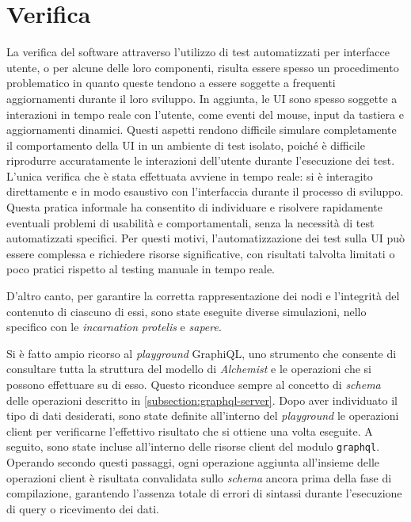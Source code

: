 \section{Verifica}
La verifica del software attraverso l'utilizzo di test automatizzati per interfacce utente, o per alcune delle loro componenti, risulta essere spesso un procedimento problematico in quanto queste tendono a essere soggette a frequenti aggiornamenti durante il loro sviluppo. In aggiunta, le \ac{UI} sono spesso soggette  a interazioni in tempo reale con l'utente, come eventi del mouse, input da tastiera e aggiornamenti dinamici. Questi aspetti rendono difficile simulare completamente il comportamento della \ac{UI} in un ambiente di test isolato, poiché è difficile riprodurre accuratamente le interazioni dell'utente durante l'esecuzione dei test. L'unica verifica che è stata effettuata avviene in tempo reale: si è interagito direttamente e in modo esaustivo con l'interfaccia durante il processo di sviluppo. Questa pratica informale ha consentito di individuare e risolvere rapidamente eventuali problemi di usabilità e comportamentali, senza la necessità di test automatizzati specifici. 
Per questi motivi, l'automatizzazione dei test sulla UI può essere complessa e richiedere risorse significative, con risultati talvolta limitati o poco pratici rispetto al testing manuale in tempo reale.

D'altro canto, per garantire la corretta rappresentazione dei nodi e l'integrità del contenuto di ciascuno di essi, sono state eseguite diverse simulazioni, nello specifico con le \textit{incarnation} \textit{protelis} e \textit{sapere}.

Si è fatto ampio ricorso al \textit{playground} GraphiQL, uno strumento che consente di consultare tutta la struttura del modello di \textit{Alchemist} e le operazioni che si possono effettuare su di esso. Questo riconduce sempre al concetto di \textit{schema} delle operazioni descritto in \ref{subsection:graphql-server}. 
Dopo aver individuato il tipo di dati desiderati, sono state definite all'interno del \textit{playground} le operazioni client per verificarne l’effettivo risultato che si ottiene una volta eseguite. 
A seguito, sono state incluse all’interno delle risorse client del modulo \texttt{graphql}. 
Operando secondo questi passaggi, ogni operazione aggiunta all’insieme delle operazioni client è risultata convalidata sullo \textit{schema} ancora prima della fase di compilazione, garantendo l'assenza totale di errori di sintassi durante l'esecuzione di query o ricevimento dei dati. 






